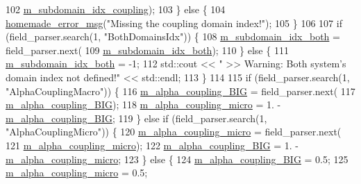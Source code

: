 \begin{DoxyCode}
102                     \hyperlink{classweight__parameter__function_a516c68be83fc9cdc80c8bf4aecf395a4}{m\_subdomain\_idx\_coupling});
103         \} \textcolor{keywordflow}{else} \{
104             \hyperlink{common__header_8h_a05d65d26b911668ac90085745dca71f6}{homemade\_error\_msg}(\textcolor{stringliteral}{"Missing the coupling domain index!"});
105         \}
106 
107         \textcolor{keywordflow}{if} (field\_parser.search(1, \textcolor{stringliteral}{"BothDomainsIdx"})) \{
108             \hyperlink{classweight__parameter__function_a0e5865143597a2ce9a19acaaa37a5bca}{m\_subdomain\_idx\_both} = field\_parser.next(
109                     \hyperlink{classweight__parameter__function_a0e5865143597a2ce9a19acaaa37a5bca}{m\_subdomain\_idx\_both});
110         \} \textcolor{keywordflow}{else} \{
111             \hyperlink{classweight__parameter__function_a0e5865143597a2ce9a19acaaa37a5bca}{m\_subdomain\_idx\_both} = -1;
112             std::cout << \textcolor{stringliteral}{" >> Warning: Both system's domain index not defined!"} << std::endl;
113         \}
114 
115         \textcolor{keywordflow}{if} (field\_parser.search(1, \textcolor{stringliteral}{"AlphaCouplingMacro"})) \{
116             \hyperlink{classweight__parameter__function_a47850e20883c96b524fc322ea5cbc82e}{m\_alpha\_coupling\_BIG} = field\_parser.next(
117                     \hyperlink{classweight__parameter__function_a47850e20883c96b524fc322ea5cbc82e}{m\_alpha\_coupling\_BIG});
118             \hyperlink{classweight__parameter__function_a2136698edf313c3d9250027b07cfeb52}{m\_alpha\_coupling\_micro} = 1. - 
      \hyperlink{classweight__parameter__function_a47850e20883c96b524fc322ea5cbc82e}{m\_alpha\_coupling\_BIG};
119         \} \textcolor{keywordflow}{else} \textcolor{keywordflow}{if} (field\_parser.search(1, \textcolor{stringliteral}{"AlphaCouplingMicro"})) \{
120             \hyperlink{classweight__parameter__function_a2136698edf313c3d9250027b07cfeb52}{m\_alpha\_coupling\_micro} = field\_parser.next(
121                     \hyperlink{classweight__parameter__function_a2136698edf313c3d9250027b07cfeb52}{m\_alpha\_coupling\_micro});
122             \hyperlink{classweight__parameter__function_a47850e20883c96b524fc322ea5cbc82e}{m\_alpha\_coupling\_BIG} = 1. - 
      \hyperlink{classweight__parameter__function_a2136698edf313c3d9250027b07cfeb52}{m\_alpha\_coupling\_micro};
123         \} \textcolor{keywordflow}{else} \{
124             \hyperlink{classweight__parameter__function_a47850e20883c96b524fc322ea5cbc82e}{m\_alpha\_coupling\_BIG} = 0.5;
125             \hyperlink{classweight__parameter__function_a2136698edf313c3d9250027b07cfeb52}{m\_alpha\_coupling\_micro} = 0.5;

\end{DoxyCode}
